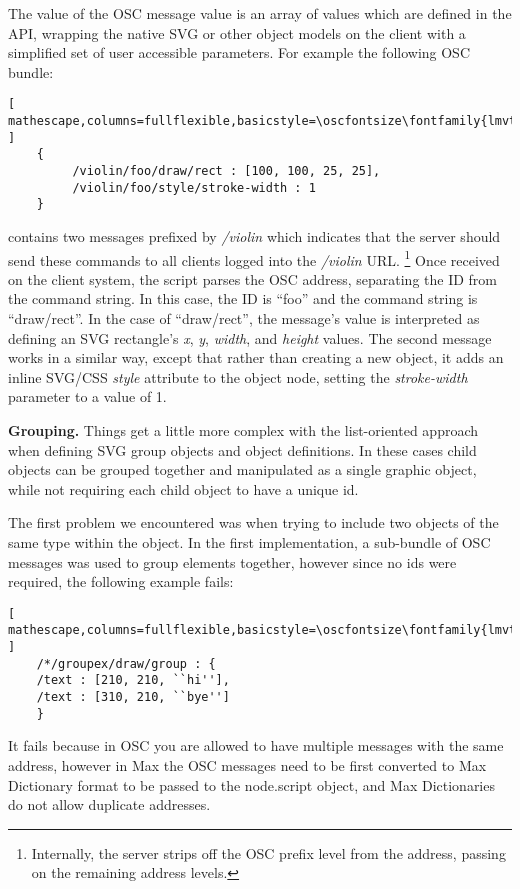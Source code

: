 The value of the OSC message value is an array of values which are defined in the \drawsocket API, wrapping the native SVG or other object models on the client with a simplified set of user accessible parameters. For example the following OSC bundle:

\begin{lstlisting}[ mathescape,columns=fullflexible,basicstyle=\oscfontsize\fontfamily{lmvtt}\selectfont ]
    {
         /violin/foo/draw/rect : [100, 100, 25, 25],
         /violin/foo/style/stroke-width : 1
    }
\end{lstlisting}

\noindent
contains two messages prefixed by \textit{/violin} which indicates that the server should send these commands to all clients logged into the \textit{/violin} URL. \footnote{Internally, the server strips off the OSC prefix level from the address, passing on the remaining address levels.} Once received on the client system, the script parses the OSC address, separating the ID from the command string. In this case, the ID is ``foo'' and the command string is ``draw/rect''.
In the case of ``draw/rect'', the message's value is interpreted as defining an SVG rectangle's \textit{x},  \textit{y},  \textit{width}, and \textit{height} values.
The second message works in a similar way, except that rather than creating a new object, it adds an inline SVG/CSS \textit{style} attribute to the object node, setting the \textit{stroke-width} parameter to a value of 1.

\medskip
\noindent
\textbf{Grouping.} 
Things get a little more complex with the list-oriented approach when defining SVG group objects and object definitions. 
In these cases child objects can be grouped together and manipulated as a single graphic object, while not requiring each child object to have a unique id.

The first problem we encountered was when trying to include two objects of the same type within the object. 
In the first implementation, a sub-bundle of OSC messages was used to group elements together, however since no ids were required, the following example fails:

\begin{lstlisting}[ mathescape,columns=fullflexible,basicstyle=\oscfontsize\fontfamily{lmvtt}\selectfont ]
    /*/groupex/draw/group : {
	/text : [210, 210, ``hi''],
	/text : [310, 210, ``bye'']
    }
\end{lstlisting}

\noindent
It fails because in OSC you are allowed to have multiple messages with the same address, however in Max the OSC messages need to be first converted to Max Dictionary format to be passed to the node.script object, and Max Dictionaries do not allow duplicate addresses.

